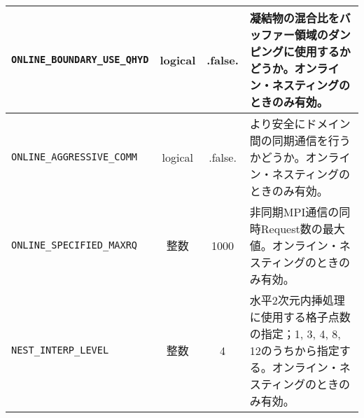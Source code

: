 \begin{tabularx}{150mm}{|l|c|c|X|}
 \verb|ONLINE_BOUNDARY_USE_QHYD| & logical & .false. & 凝結物の混合比をバッファー領域のダンピングに使用するかどうか。オンライン・ネスティングのときのみ有効。 \\ \hline
 \verb|ONLINE_AGGRESSIVE_COMM| & logical & .false. & より安全にドメイン間の同期通信を行うかどうか。オンライン・ネスティングのときのみ有効。 \\ \hline
 \verb|ONLINE_SPECIFIED_MAXRQ| & 整数 & 1000 & 非同期MPI通信の同時Request数の最大値。オンライン・ネスティングのときのみ有効。 \\ \hline
 \verb|NEST_INTERP_LEVEL| & 整数 & 4 & 水平2次元内挿処理に使用する格子点数の指定；1, 3, 4, 8, 12のうちから指定する。オンライン・ネスティングのときのみ有効。 \\ \hline
\end{tabularx}




